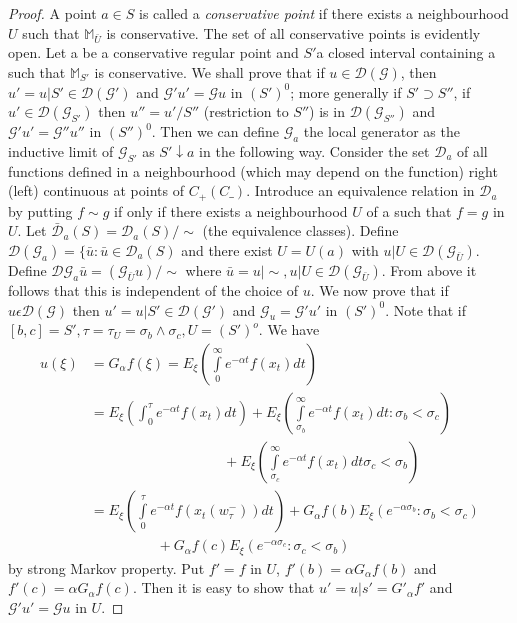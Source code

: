 \begin{proof}
A point $a \in S$ is called a \textit{conservative point} if there
exists a neighbourhood $U$ such that $\mathbb{M}_{\bar{U}}$ is
conservative. The set of all conservative points is evidently open. Let
a be a conservative regular point and $S'$a closed interval containing
a such that $\mathbb{M}_{S'}$ is conservative. We shall prove that if
$u \in \mathscr{D}(\mathscr{G})$, then $u'= u| S' \in \mathscr{D}
(\mathscr{G}')$ and $\mathscr{G}' u' = \mathscr{G} u$ in $(S')^0$;
more generally if $S' \supset S''$, if $u' \in
\mathscr{D}(\mathscr{G}_{S'})$ then $u'' = u'/ S''$ (restriction to  
$S''$) is in $\mathscr{D}(\mathscr{G}_{S''})$ and $\mathscr{G}' u'=
\mathscr{G}'' u''$ in $(S'')^0$. Then we can define $\mathscr{G}_a$
the local generator as the inductive limit of $\mathscr{G}_{S'}$ as $S'
\downarrow a$ in the following way. Consider the set $\mathscr{D}_a$
of all functions defined in a neighbourhood (which may depend on the
function) right (left) continuous at points of $C_+(C\_)$. Introduce
an equivalence relation in $\mathscr{D}_a$ by putting $f \sim g$ if
only if there exists a neighbourhood $U$ of a such that $f =g$ in
$U$. Let $\bar{\mathscr{D}}_a(S) = \mathscr{D}_a(S)/ \sim$ (the
equivalence classes). Define $\mathscr{D}(\mathscr{G}_a)=
\Big\{\bar{u}:\bar{u}\in \mathscr{D}_a(S) $ and there exist $U=U(a)$
with $u|U \in \mathscr{D}(\mathscr{G}_{\bar{U}})$. Define\pageoriginale
$\mathscr{D}\mathscr{G}_a \bar{u}= (\mathscr{G}_{\bar{U}}u)/ \sim$ where
$\bar{u} = u | \sim , u | U \in \mathscr{D} (\mathscr{G}_{\bar{U}})$. 
From above it follows that this is independent of the
choice of $u$. We now prove that if $u \epsilon \mathscr{D}
(\mathscr{G})$ then $u' = u| S' \in \mathscr{D}(\mathscr{G}')$ and
$\mathscr{G}_u=\mathscr{G}' u'$ in $(S')^0$. Note that if $[b,c]= S',
\tau = \tau_U = \sigma _b \wedge \sigma_c, U = (S')^o$. 
We have
\begin{align*}
  u(\xi) &= G_\alpha f (\xi) = E_\xi \left(\int \limits^{\infty}_{0}
  e^{-\alpha t} f(x_t) dt\right)\\
  &= E_\xi \left(\int^{\tau}_{0}e^{-\alpha t} f(x_t) dt\right) + E_\xi \left(
  \int\limits^{\infty}_{\sigma_b} e^{-\alpha t} f(x_t) dt: \sigma_b <
  \sigma_c \right)\\ 
  & \hspace{4cm} + E_\xi \left( \int\limits^{\infty}_{\sigma_c} e^{-\alpha t}
  f(x_t)dt \sigma_c < \sigma _b \right)\\ 
  &= E_\xi \left(\int\limits^{\tau}_{0} e^{- \alpha t} f(x_t(w^-_\tau)) dt\right)
  + G_\alpha f (b) E_\xi (e^{-\alpha \sigma_b}: \sigma_b <
  \sigma_c)\\ 
  & \hspace{2cm}+  G_\alpha f (c) E_{\xi} (e^{-\alpha \sigma _c}:
  \sigma_c < \sigma_b )   
\end{align*}
by strong Markov property. Put $f' = f$ in $U$, $f'(b) = \alpha
G_\alpha f (b)$ and $f'(c) = \alpha G_\alpha f (c)$. Then it is easy
to show that $u' = u| s' = G'_\alpha f' $ and $\mathscr{G}' u' =
\mathscr{G} u $ in $U$. 


\end{proof}
